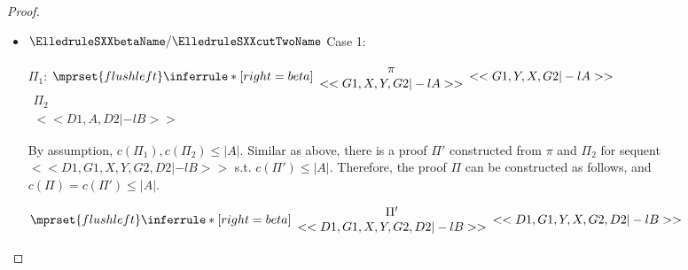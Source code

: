 \begin{proof}
\begin{enumerate}
\begin{itemize}
    \item $\ElledruleSXXbetaName / \ElledruleSXXcutTwoName$ Case 1:
      \begin{center}
        \scriptsize
        $\Pi_1$:
        \begin{math}
          $$\mprset{flushleft}
          \inferrule* [right={\tiny beta}] {
            {
              \begin{array}{c}
                \pi \\
                {<<G1, X, Y, G2 |-l A>>}
              \end{array}
            }
          }{<<G1, Y, X, G2 |-l A>>}
        \end{math}
        \qquad\qquad
        \begin{math}
          \begin{array}{c}
            \Pi_2 \\
            {<<D1, A, D2 |-l B>>}
          \end{array}
        \end{math}
      \end{center}
      By assumption, $c(\Pi_1),c(\Pi_2)\leq |A|$. Similar as above, there is a proof $\Pi'$
      constructed from $\pi$ and $\Pi_2$ for sequent $<<D1, G1, X, Y, G2, D2 |-l B>>$ s.t.
      $c(\Pi')\leq|A|$. Therefore, the proof $\Pi$ can be constructed as follows, and
      $c(\Pi)=c(\Pi')\leq|A|$.
      \begin{center}
        \scriptsize
        \begin{math}
          $$\mprset{flushleft}
          \inferrule* [right={\tiny beta}] {
            {
              \begin{array}{cc}
                \Pi' \\
                {<<D1, G1, X, Y, G2, D2 |-l B>>}
              \end{array}
            }
          }{<<D1, G1, Y, X, G2, D2 |-l B>>}
        \end{math}
      \end{center}


\end{itemize}
\end{enumerate}
\end{proof}
